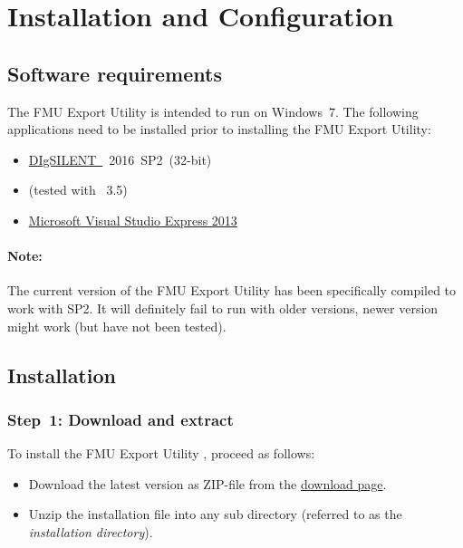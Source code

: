 
\chapter{Installation and Configuration}

\section{Software requirements}

The \fmipp \pf FMU Export Utility is intended to run on Windows~7. The following applications need to be installed prior to installing the \fmipp \pf FMU Export Utility:
\begin{itemize}
  \item \href{http://www.digsilent.com/}{DIgSILENT~\pf}~2016~SP2~(32-bit)
  \item \href{https://www.python.org/}{\python} (tested with \python~3.5)
  \item \href{https://www.microsoft.com/en-us/download/details.aspx?id=44914}{Microsoft Visual Studio Express 2013}
\end{itemize}

\subsubsection*{Note:}
The current version of the \fmipp \pf FMU Export Utility has been specifically compiled to work with  SP2.
It will definitely fail to run with older versions, newer version might work (but have not been tested).


\section{Installation}
\label{sec:install}

\subsection*{Step~1: Download and extract}

To install the \fmipp \pf FMU Export Utility , proceed as follows:
\begin{itemize}
  \item Download the latest version as ZIP-file from the \href{http://sourceforge.net/projects/powerfactory-fmu/files/latest/download}{download page}.
  \item Unzip the installation file into any sub directory (referred to as the \emph{installation directory}).
\end{itemize}

